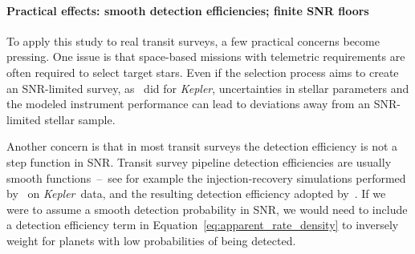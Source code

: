 \documentclass[12pt,modern]{aastex61}
\begin{document}

\paragraph{Practical effects: smooth detection efficiencies; finite SNR floors}
To apply this study to real transit surveys, a few practical concerns
become pressing.  One issue is that space-based missions with
telemetric requirements are often required to select target stars.
Even if the selection process aims to create an SNR-limited
survey, as~\citet{batalha_selection_2010} did for {\it Kepler},
uncertainties in stellar parameters and the modeled instrument
performance can lead to deviations away from an SNR-limited stellar
sample.

Another concern is that in most transit surveys the detection
efficiency is not a step function in SNR.  Transit survey pipeline
detection efficiencies are usually smooth functions~--~see for example
the injection-recovery simulations performed
by~\citet{christiansen_measuring_2016} on {\it Kepler}\ data, and the
resulting detection efficiency adopted
by~\citet{fulton_california-_2017}.  If we were to assume a smooth
detection probability in SNR, we would need to include a detection
efficiency term in Equation~\ref{eq:apparent_rate_density} to
inversely weight for planets with low probabilities of being detected.
\end{document}
